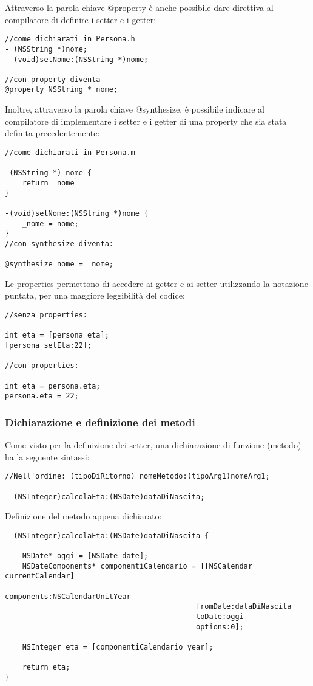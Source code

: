 \bigskip
\bigskip
\bigskip
Attraverso la parola chiave @property è anche possibile dare direttiva al compilatore di definire i setter e i getter:
\lstset{language=[Objective]C, breakindent=40pt, breaklines}
\begin{lstlisting}
//come dichiarati in Persona.h
- (NSString *)nome;
- (void)setNome:(NSString *)nome;

//con property diventa
@property NSString * nome;
\end{lstlisting}
\bigskip
\bigskip
\bigskip
Inoltre, attraverso la parola chiave @synthesize, è possibile indicare al compilatore di implementare i setter e i getter di una property che sia stata definita precedentemente:
\lstset{language=[Objective]C, breakindent=40pt, breaklines}
\begin{lstlisting}
//come dichiarati in Persona.m

-(NSString *) nome {
	return _nome
}

-(void)setNome:(NSString *)nome {
	_nome = nome;
}
//con synthesize diventa:

@synthesize nome = _nome; 
\end{lstlisting}
Le properties permettono di accedere ai getter e ai setter utilizzando la notazione puntata, per una maggiore leggibilità del codice:
\lstset{language=[Objective]C, breakindent=40pt, breaklines}
\begin{lstlisting}
//senza properties: 

int eta = [persona eta]; 
[persona setEta:22]; 

//con properties: 

int eta = persona.eta;
persona.eta = 22;
\end{lstlisting}
\newpage
\subsubsection{Dichiarazione e definizione dei metodi}
Come visto per la definizione dei setter, una dichiarazione di funzione (metodo) ha la seguente sintassi: 
\lstset{language=[Objective]C, breakindent=40pt, breaklines}
\begin{lstlisting}
//Nell'ordine: (tipoDiRitorno) nomeMetodo:(tipoArg1)nomeArg1;

- (NSInteger)calcolaEta:(NSDate)dataDiNascita;
\end{lstlisting}
Definizione del metodo appena dichiarato: 
\lstset{language=[Objective]C, breakindent=40pt, breaklines}
\begin{lstlisting}
- (NSInteger)calcolaEta:(NSDate)dataDiNascita {

	NSDate* oggi = [NSDate date];
	NSDateComponents* componentiCalendario = [[NSCalendar currentCalendar] 
                                   			components:NSCalendarUnitYear 
                                   			fromDate:dataDiNascita
                                   			toDate:oggi
                                   			options:0];
	
	NSInteger eta = [componentiCalendario year];
	
	return eta;
}
\end{lstlisting}
